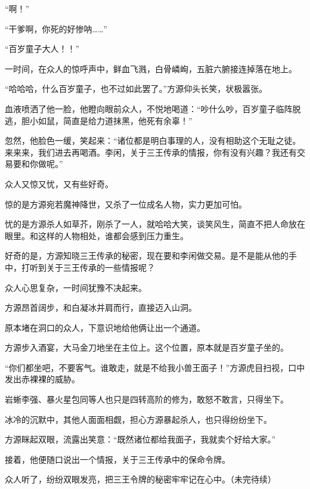 \begin{this_body}
“啊！”

“干爹啊，你死的好惨呐……”

“百岁童子大人！！”

一时间，在众人的惊呼声中，鲜血飞溅，白骨嶙峋，五脏六腑接连掉落在地上。

“哈哈哈，什么百岁童子，也不过如此罢了。”方源仰头长笑，状极嚣张。

血液喷洒了他一脸，他瞪向眼前众人，不悦地喝道：“吵什么吵，百岁童子临阵脱逃，胆小如鼠，简直是给力道抹黑，他死有余辜！”

忽然，他脸色一缓，笑起来：“诸位都是明白事理的人，没有相助这个无耻之徒。来来来，我们进去再喝酒。李闲，关于三王传承的情报，你有没有兴趣？我还有交易要和你做呢。”

众人又惊又忧，又有些好奇。

惊的是方源宛若魔神降世，又杀了一位成名人物，实力更加可怕。

忧的是方源杀人如草芥，刚杀了一人，就哈哈大笑，谈笑风生，简直不把人命放在眼里。和这样的人物相处，谁都会感到压力重生。

好奇的是，方源知晓三王传承的秘密，现在要和李闲做交易。是不是能从他的手中，打听到关于三王传承的一些情报呢？

众人心思复杂，一时间犹豫不决起来。

方源昂首阔步，和白凝冰并肩而行，直接迈入山洞。

原本堵在洞口的众人，下意识地给他俩让出一个通道。

方源步入酒宴，大马金刀地坐在主位上。这个位置，原本就是百岁童子坐的。

“你们都坐吧，不要客气。谁敢走，就是不给我小兽王面子！”方源虎目扫视，口中发出赤裸裸的威胁。

岩蜥李强、暴火星包同等人也只是四转高阶的修为，敢怒不敢言，只得坐下。

冰冷的沉默中，其他人面面相觑，担心方源暴起杀人，也只得纷纷坐下。

方源眯起双眼，流露出笑意：“既然诸位都给我面子，我就卖个好给大家。”

接着，他便随口说出一个情报，关于三王传承中的保命令牌。

众人听了，纷纷双眼发亮，把三王令牌的秘密牢牢记在心中。（未完待续）

\end{this_body}

